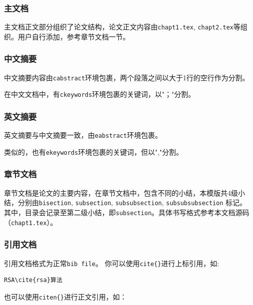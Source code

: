 \subsubsection{主文档}


主文档正文部分组织了论文结构，论文正文内容由\verb |chapt1.tex|, \verb|chapt2.tex|等组织。用户自行添加，参考章节文档一节。%

\subsubsection{中文摘要}

中文摘要内容由\verb|cabstract|环境包裹，两个段落之间以大于1行的空行作为分割。

在中文文档中，有\verb|ckeywords|环境包裹的关键词，以"；"分割。

\subsubsection{英文摘要}

 英文摘要与中文摘要一致，由\verb|eabstract|环境包裹。

 类似的，也有\verb|ekeywords|环境包裹的关键词，但以","分割。

 \subsubsection{章节文档}
 章节文档是论文的主要内容，在章节文档中，包含不同的小结，本模版共4级小结，分别由\verb|bisection|, \verb|subsection|, \verb|subsubsection|,  \verb|subsubsubsection| 标记。
 其中，目录会记录至第二级小结，即\verb|subsection|。具体书写格式参考本文档源码（\verb|chapt1.tex|）。

\subsubsection{引用文档}

引用文档格式为正常\verb|bib file|。 你可以使用\verb|cite{}|进行上标引用，如:

\begin{center}
  \begin{minipage}{0.65\textwidth}
    \begin{Verbatim}[frame=single]
      RSA\cite{rsa}算法
    \end{Verbatim}
  \end{minipage}
\end{center}

也可以使用\verb|citen{}|进行正文引用，如：

